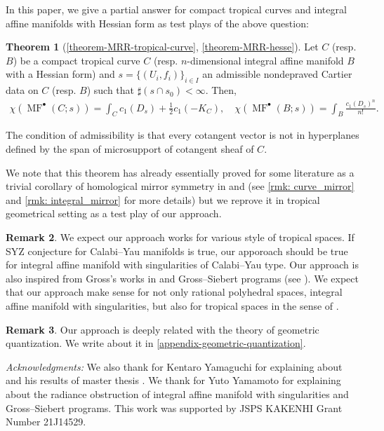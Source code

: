 \documentclass[a4paper,dvipdfmx,reqno,12pt]{amsart}
\theoremstyle{definition}
\newtheorem{theorem}{Theorem}[section]
\newtheorem{remark}[theorem]{Remark}
\newcommand{\opn}[1]{\operatorname{#1}}
\numberwithin{equation}{section}
\begin{document}
In this paper, we give a partial answer for compact tropical curves 
and integral affine manifolds with Hessian form
as test plays of the above question:

\begin{theorem}[{\cref{theorem-MRR-tropical-curve},
\cref{theorem-MRR-hesse}}] \label{thm: main}
Let $C$ (resp. $B$) be a compact tropical curve $C$ 
(resp. $n$-dimensional integral 
affine manifold $B$
with a Hessian form) and $s=\{(U_i,f_i)\}_{i\in I}$ an 
admissible nondepraved
Cartier data on $C$ (resp. $B$) such that 
$\sharp(s\cap s_0)<\infty$. Then,
\begin{align}
\chi(\opn{MF}^{\bullet}(C;s))=\int_C c_1(D_s)+\frac{1}{2}c_1(-K_C), \quad 
\chi(\opn{MF}^{\bullet}(B;s))=\int_B \frac{c_1(D_s)^{n}}{n!}.
\end{align}
\end{theorem}

The condition of admissibility is that every cotangent vector 
is not in hyperplanes defined by the span of microsupport of
cotangent sheaf of $C$. 


We note that this theorem has already essentially proved for some
literature as a trivial corollary of homological mirror symmetry 
in \cite{MR4301560} and \cite{auroux2022lagrangian} (see \cref{rmk: curve_mirror} and \cref{rmk: integral_mirror} 
for more details) but we reprove it in tropical  
geometrical setting as a test play of our approach.

\begin{remark}
We expect our approach works for various style 
of tropical spaces. 
If SYZ conjecture for Calabi--Yau manifolds
is true, our apporoach should
be true for integral affine manifold 
with singularities of Calabi--Yau type.
Our approach is 
also inspired from Gross's 
works in 
\cite{grossSpecialLagrangianFibrations1998a} and Gross--Siebert programs
(see \cite[Conjecture 1.6]{MR3525095}).
We expect that 
our approach make sense for not only rational polyhedral
spaces, integral affine manifold with singularities,
but also for tropical spaces 
in the sense of \cite[Definition 2.8]{cavalieri2020tropical}.

\end{remark}

\begin{remark}
Our approach is deeply related with the theory of
geometric quantization. We write about it in 
\cref{appendix-geometric-quantization}.
\end{remark}

\textit{Acknowledgments:}
We also thank for Kentaro Yamaguchi for explaining about
\cite{MR4234675} and his results of master thesis 
\cite{yamaguchimaster}. We thank for Yuto Yamamoto for
explaining about the radiance obstruction of integral 
affine manifold with singularities and Gross--Siebert
programs.
This work was supported by JSPS KAKENHI 
Grant Number 21J14529.
\end{document}
